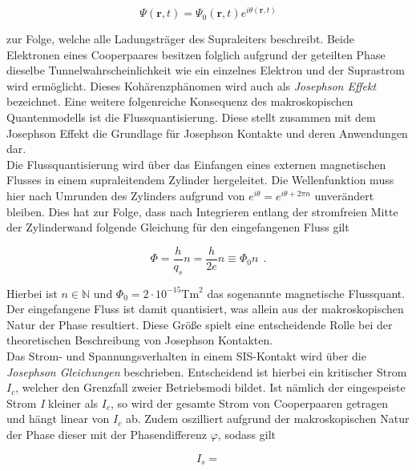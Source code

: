 \begin{equation}
\Psi(\textbf{r},t) = \Psi_0(\textbf{r},t)e^{i\theta(\textbf{r},t)}
\end{equation}

zur Folge, welche alle Ladungsträger des Supraleiters beschreibt. Beide Elektronen eines Cooperpaares besitzen folglich aufgrund der geteilten Phase dieselbe Tunnelwahrscheinlichkeit wie ein einzelnes Elektron und der Suprastrom wird ermöglicht. 
Dieses Kohärenzphänomen wird auch als \textit{Josephson Effekt} bezeichnet.
Eine weitere folgenreiche Konsequenz des makroskopischen Quantenmodells ist die Flussquantisierung. Diese stellt zusammen  mit dem Josephson Effekt die Grundlage für Josephson Kontakte und deren Anwendungen dar. \\ 

Die Flussquantisierung wird über das Einfangen eines externen magnetischen Flusses in einem supraleitendem Zylinder hergeleitet. Die Wellenfunktion muss hier nach Umrunden des Zylinders aufgrund von $e^{i\theta}=e^{i\theta + 2\pi n}$ unverändert bleiben. Dies hat zur Folge, dass nach Integrieren entlang der stromfreien Mitte der Zylinderwand folgende Gleichung für den eingefangenen Fluss gilt

\begin{equation}
\Phi = \frac{h}{q_s}n = \frac{h}{2e}n \equiv \Phi_0n \ \ .
\end{equation}

Hierbei ist $n\in\mathbb{N}$ und $\Phi_0 = 2\cdot 10^{-15} \text{Tm}^2$ das sogenannte magnetische Flussquant. Der eingefangene Fluss ist damit quantisiert, was allein aus der makroskopischen Natur der Phase resultiert. Diese Größe spielt eine entscheidende Rolle bei der theoretischen Beschreibung von Josephson Kontakten. \\

Das Strom- und Spannungsverhalten in einem SIS-Kontakt wird über die \textit{Josephson Gleichungen} beschrieben. Entscheidend ist hierbei ein kritischer Strom \textit{$I_c$}, welcher den Grenzfall zweier Betriebsmodi bildet. Ist nämlich der eingespeiste Strom \textit{I} kleiner als \textit{$I_c$}, so wird der gesamte Strom von Cooperpaaren getragen und hängt linear von \textit{$I_c$} ab. Zudem oszilliert aufgrund der makroskopischen Natur der Phase dieser mit der Phasendifferenz $\varphi$, sodass gilt

\begin{equation}
I_s = 
\end{equation}



